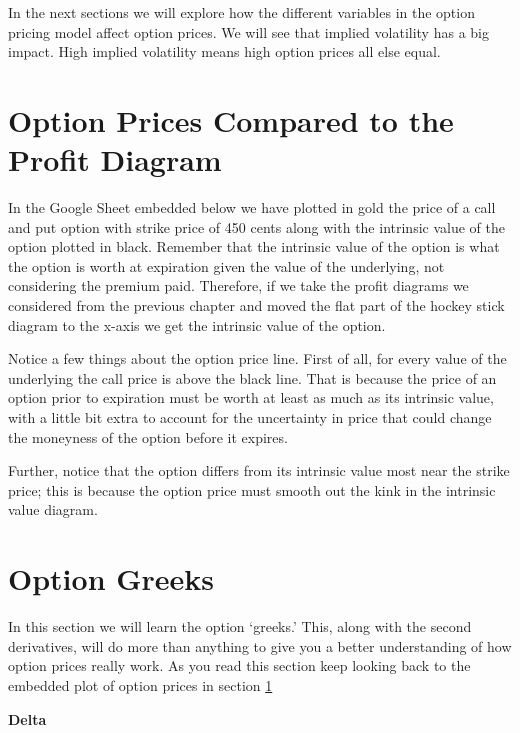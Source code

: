 \documentclass[
]{book}
\begin{document}
In the next sections we will explore how the different variables in the option pricing model affect option prices. We will see that implied volatility has a big impact. High implied volatility means high option prices all else equal.

\hypertarget{option-prices-compared-to-the-profit-diagram}{%
\section{Option Prices Compared to the Profit Diagram}\label{option-prices-compared-to-the-profit-diagram}}

In the Google Sheet embedded below we have plotted in gold the price of a call and put option with strike price of 450 cents along with the intrinsic value of the option plotted in black. Remember that the intrinsic value of the option is what the option is worth at expiration given the value of the underlying, not considering the premium paid. Therefore, if we take the profit diagrams we considered from the previous chapter and moved the flat part of the hockey stick diagram to the x-axis we get the intrinsic value of the option.

Notice a few things about the option price line. First of all, for every value of the underlying the call price is above the black line. That is because the price of an option prior to expiration must be worth at least as much as its intrinsic value, with a little bit extra to account for the uncertainty in price that could change the moneyness of the option before it expires.

Further, notice that the option differs from its intrinsic value most near the strike price; this is because the option price must smooth out the kink in the intrinsic value diagram.

\hypertarget{option-greeks}{%
\section{Option Greeks}\label{option-greeks}}

In this section we will learn the option `greeks.' This, along with the second derivatives, will do more than anything to give you a better understanding of how option prices really work. As you read this section keep looking back to the embedded plot of option prices in section \ref{option-prices-compared-to-the-profit-diagram}

\textbf{Delta}
\end{document}
